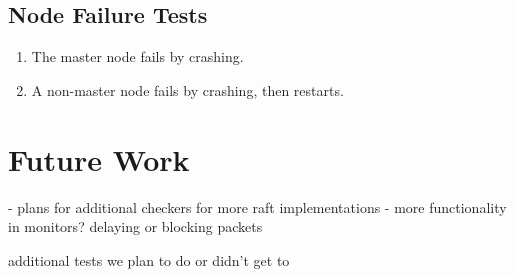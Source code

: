\documentclass[UTF8]{article}
\begin{document}
\subsection{Node Failure Tests}
\begin{enumerate}
  \item The master node fails by crashing.
  \item A non-master node fails by crashing, then restarts.
\end{enumerate}

\section{Future Work}

- plans for additional checkers for more raft implementations
- more functionality in monitors? delaying or blocking packets

additional tests we plan to do or didn't get to




\end{document}
